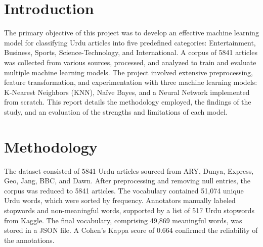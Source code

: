 \documentclass[sigconf]{acmart}
\begin{document}




\maketitle

\section{Introduction}
The primary objective of this project was to develop an effective machine learning model for classifying Urdu articles into five predefined categories: Entertainment, Business, Sports, Science-Technology, and International. A corpus of 5841 articles was collected from various sources, processed, and analyzed to train and evaluate multiple machine learning models. The project involved extensive preprocessing, feature transformation, and experimentation with three machine learning models: K-Nearest Neighbors (KNN), Naïve Bayes, and a Neural Network implemented from scratch. This report details the methodology employed, the findings of the study, and an evaluation of the strengths and limitations of each model.

\section{Methodology}
The dataset consisted of 5841 Urdu articles sourced from ARY, Dunya, Express, Geo, Jang, BBC, and Dawn. After preprocessing and removing null entries, the corpus was reduced to 5841 articles. The vocabulary contained 51,074 unique Urdu words, which were sorted by frequency. Annotators manually labeled stopwords and non-meaningful words, supported by a list of 517 Urdu stopwords from Kaggle. The final vocabulary, comprising 49,869 meaningful words, was stored in a JSON file. A Cohen’s Kappa score of 0.664 confirmed the reliability of the annotations.
\end{document}
